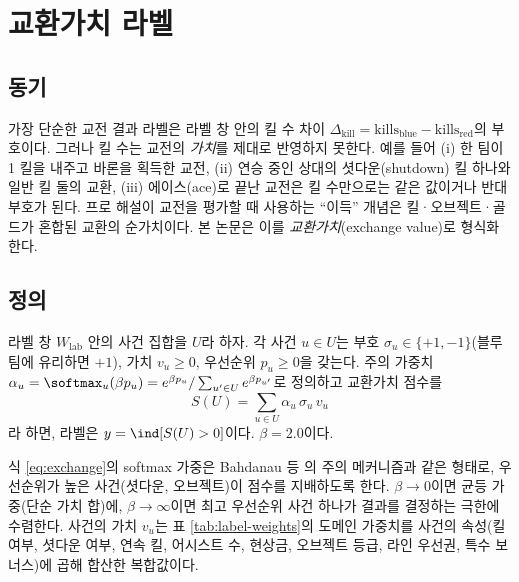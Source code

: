 \chapter{교환가치 라벨}
\label{ch:label}

\section{동기}
\label{sec:label-motivation}

가장 단순한 교전 결과 라벨은 라벨 창 안의 킬 수 차이 $\Delta_{\mathrm{kill}} = \mathrm{kills}_{\mathrm{blue}} - \mathrm{kills}_{\mathrm{red}}$의 부호이다. 그러나 킬 수는 교전의 \emph{가치}를 제대로 반영하지 못한다. 예를 들어 (i) 한 팀이 1 킬을 내주고 바론을 획득한 교전, (ii) 연승 중인 상대의 셧다운(shutdown) 킬 하나와 일반 킬 둘의 교환, (iii) 에이스(ace)로 끝난 교전은 킬 수만으로는 같은 값이거나 반대 부호가 된다. 프로 해설이 교전을 평가할 때 사용하는 ``이득'' 개념은 킬·오브젝트·골드가 혼합된 교환의 순가치이다. 본 논문은 이를 \emph{교환가치}(exchange value)로 형식화한다.

\section{정의}
\label{sec:label-definition}

\begin{definition}[교환가치 라벨]
\label{def:label}
라벨 창 $W_{\mathrm{lab}}$ 안의 사건 집합을 $U$라 하자. 각 사건 $u \in U$는 부호 $\sigma_u \in \{+1, -1\}$(블루 팀에 유리하면 $+1$), 가치 $v_u \ge 0$, 우선순위 $p_u \ge 0$을 갖는다. 주의 가중치 $\alpha_u = \softmax_u(\beta p_u) = e^{\beta p_u}/\sum_{u'\in U} e^{\beta p_{u'}}$로 정의하고 교환가치 점수를
\begin{equation}
  S(U) = \sum_{u \in U} \alpha_u\, \sigma_u\, v_u
  \label{eq:exchange}
\end{equation}
라 하면, 라벨은 $y = \ind[S(U) > 0]$이다. $\beta = 2.0$이다.
\end{definition}

식 \eqref{eq:exchange}의 softmax 가중은 Bahdanau 등 \cite{bahdanau2015neural}의 주의 메커니즘과 같은 형태로, 우선순위가 높은 사건(셧다운, 오브젝트)이 점수를 지배하도록 한다. $\beta \to 0$이면 균등 가중(단순 가치 합)에, $\beta \to \infty$이면 최고 우선순위 사건 하나가 결과를 결정하는 극한에 수렴한다. 사건의 가치 $v_u$는 표 \ref{tab:label-weights}의 도메인 가중치를 사건의 속성(킬 여부, 셧다운 여부, 연속 킬, 어시스트 수, 현상금, 오브젝트 등급, 라인 우선권, 특수 보너스)에 곱해 합산한 복합값이다.

